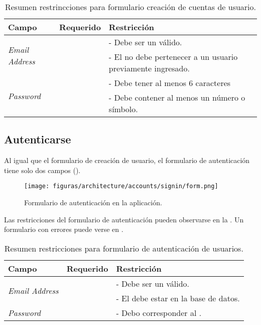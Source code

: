 \begin{table}[H]
    \centering
	\begin{tabular}{ |l|c||l| }
		\hline Campo & Requerido & Restricción \\ \hline
		\multirow{2}{*}{\textit{Email Address}} &  \multirow{2}{*}{\checkmark}
				& - Debe ser un \email válido. \\ 
			& 	& - El \email no debe pertenecer a un usuario previamente ingresado.\\ \hline
		\multirow{2}{*}{\textit{Password}} 		&  \multirow{2}{*}{\checkmark}	
				& - Debe tener al menos 6 caracteres \\ 
			& 	& - Debe contener al menos un número o símbolo. \\ \hline
	\end{tabular}
 	\caption{Resumen restrincciones para formulario creación de cuentas de usuario.}
    \label{tab:architecture:accounts:new:form}
\end{table}

\subsection{Autenticarse}

Al igual que el formulario de creación de usuario, el formulario de autenticación tiene solo dos campos ().

\begin{figure}[H]
	\centering
	\texttt{[image: figuras/architecture/accounts/signin/form.png]}
	\caption{Formulario de autenticación en la aplicación.}
	\label{figure:architecture:accounts:signin:form}
\end{figure}

Las restricciones del formulario de autenticación pueden observarse en la . Un formulario con errores puede verse en .

\begin{table}[H]
    \centering
	\begin{tabular}{ |l|c||l| }
		\hline Campo & Requerido & Restricción \\ \hline
		\multirow{2}{*}{\textit{Email Address}} &  \multirow{2}{*}{\checkmark}
				& - Debe ser un \email válido. \\ 
			& 	& - El \email debe estar en la base de datos. \\ \hline
		\multirow{1}{*}{\textit{Password}} 		&  \multirow{1}{*}{\checkmark} & - Debo corresponder al \email. \\ \hline
	\end{tabular}
 	\caption{Resumen restricciones para formulario de autenticación de usuarios.}
    \label{tab:architecture:accounts:signin:form}
\end{table}

